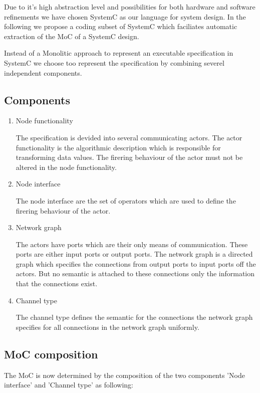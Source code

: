 Due to it's high abstraction level and possibilities for both
hardware and software refinements we have chosen SystemC as
our language for system design. In the following we propose a
coding subset of SystemC which faciliates automatic extraction
of the MoC of a SystemC design.

Instead of a Monolitic approach to represent an executable specification
in SystemC we choose too represent the specification
by combining severel independent components.

\subsection{Components}

\begin{enumerate}
\item Node functionality

The specification is devided into several communicating actors.
The actor functionality is the algorithmic description
which is responsible for transforming data values. The firering behaviour
of the actor must not be altered in the node functionality.

\item Node interface

The node interface are the set of operators which are used to
define the firering behaviour of the actor.

\item Network graph

The actors have ports which are their only means of communication.
These ports are either input ports or output ports.
The network graph is a directed graph which specifies the connections from
output ports to input ports off the actors.
But no semantic is attached to these connections
only the information that the connections exist.

\item
Channel type

The channel type defines the semantic for the connections
the network graph specifies for all connections in the
network graph uniformly.
\end{enumerate}

\subsection{MoC composition}

The MoC is now determined by the composition of the two components 'Node interface'
and 'Channel type' as following:

